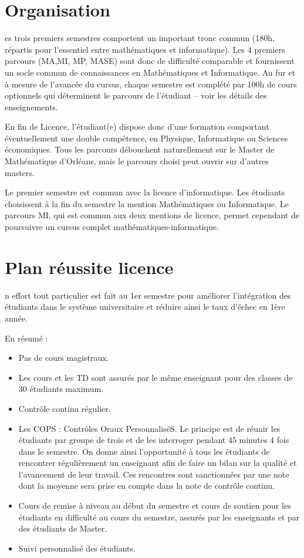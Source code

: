 \documentclass[10pt, a5paper]{report}
\begin{document}
\begin{spacing}{1.5}

\section*{Organisation}

es trois premiers semestres comportent un important tronc commun (180h, répartis pour l'essentiel entre mathématiques et informatique). Les 4 premiers parcours (MA,MI, MP, MASE) sont donc de difficulté comparable et fournissent un socle commun de connaissances en Mathématiques et Informatique. Au fur et à mesure de l'avancée du cursus, chaque semestre est complété par 100h de cours optionnels qui déterminent le parcours de l'étudiant -- voir les détails des enseignements.

En fin de Licence, l'étudiant(e) dispose donc d'une formation comportant éventuellement une double compétence, en Physique, Informatique ou Sciences économiques. Tous les parcours débouchent naturellement sur le Master de Mathématique d'Orléans, mais le parcours choisi peut ouvrir sur d'autres masters.

Le premier semestre est commun avec la licence d'informatique. Les étudiants choisissent à la fin du semestre la mention Mathématiques ou Informatique. Le parcours MI, qui est commun aux deux mentions de licence, permet cependant de poursuivre un cursus complet mathématiques-informatique.


\section*{Plan réussite licence}

n effort tout particulier est fait au 1er semestre pour améliorer l'intégration des étudiants dans le système universitaire et réduire ainsi le taux d'échec en 1ère année.

En résumé :
\begin{itemize}
\item Pas de cours magistraux. 
\item Les cours et les TD sont assurés par le même enseignant pour des classes de 30 étudiants maximum. 
\item Contrôle continu régulier. 
\item Les COPS : Contrôles Oraux PersonnaliséS. Le principe est de réunir les étudiants par groupe de trois et de les interroger pendant 45 minutes 4 fois dans le semestre. On donne ainsi l'opportunité à tous les étudiants de rencontrer régulièrement un enseignant afin de faire un bilan sur la qualité et l'avancement de leur travail. Ces rencontres sont sanctionnées par une note dont la moyenne sera prise en compte dans la note de contrôle continu. 
\item Cours de remise à niveau au début du semestre et cours de soutien pour les étudiants en difficulté au cours du semestre, assurés par les enseignants et par des étudiants de Master. 
\item Suivi personnalisé des étudiants.
\end{itemize}


\end{spacing}
\end{document}
